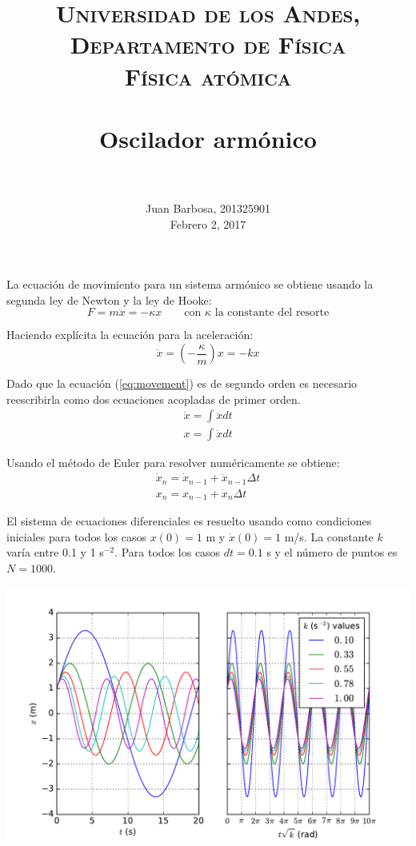\documentclass[paper=letter, fontsize=11pt]{scrartcl}
\title{
        \usefont{OT1}{bch}{b}{n}
        \normalfont \normalsize \textsc{Universidad de los Andes, Departamento de F\'isica \\
        F\'isica at\'omica} \\ [25pt]
        \horrule{0.5pt} \\[0.4cm]
        \huge Oscilador arm\'onico \\
        \horrule{2pt} \\[0.5cm]
}
\author{
        \normalfont                                 \normalsize
        Juan Barbosa, 201325901\\[-3pt]      \normalsize
        Febrero 2, 2017
}
\date{}
\begin{document}
\maketitle

La ecuaci\'on de movimiento para un sistema arm\'onico se obtiene usando la segunda ley de Newton y la ley de Hooke:
\begin{equation*}
	F = m\ddot{x} = -\kappa x \qquad \text{con $\kappa$ la constante del resorte}
\end{equation*}

Haciendo expl\'icita la ecuaci\'on para la aceleraci\'on:
\begin{equation}\label{eq:movement}
	\ddot{x} = \left(-\dfrac{\kappa}{m}\right)x = -kx
\end{equation}

Dado que la ecuaci\'on (\ref{eq:movement}) es de segundo orden es necesario reescribirla como dos ecuaciones acopladas de primer orden. 
\begin{equation}
	\begin{matrix}
		\dot{x} = \int\ddot{x}dt \\
		x = \int\dot{x}dt
	\end{matrix}
\end{equation}

Usando el m\'etodo de Euler para resolver num\'ericamente se obtiene:
\begin{equation}
	\begin{matrix}
	\dot{x}_n = \dot{x}_{n-1} + \ddot{x}_{n-1}\Delta t \\
	x_n = x_{n-1} + \dot{x}_n\Delta t
	\end{matrix}
\end{equation}

El sistema de ecuaciones diferenciales es resuelto usando como condiciones iniciales para todos los casos $x(0) = 1$ m y $\dot{x}(0) = 1$ m/s. La constante $k$ var\'ia entre 0.1 y 1 s$^{-2}$. Para todos los casos $dt = 0.1$ s y el n\'umero de puntos es $N = 1000$. 

\begin{center}
	\includegraphics[width=0.8\linewidth]{plot.pdf}
\end{center}
\end{document}
